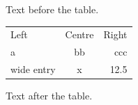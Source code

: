 \documentclass[12pt]{article}
\begin{document}
Text before the table.

\begin{tabular}{lcr}Left & Centre & Right\\a & bb & ccc\\wide entry & x & 12.5\end{tabular}

Text after the table.
\end{document}

